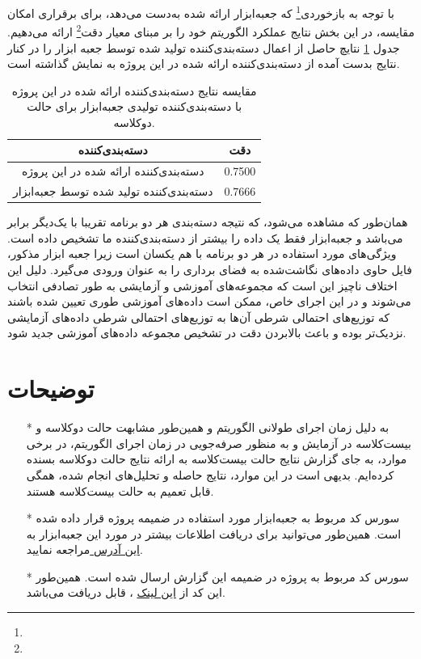 \documentclass[11.5pt,a4paper]{article}
\begin{document}
با توجه به بازخوردی\footnote{} که جعبه‌ابزار ارائه شده به‌دست می‌دهد، برای برقراری امکان مقایسه، در این بخش نتایج عملکرد الگوریتم خود را بر مبنای معیار دقت\footnote{} ارائه می‌دهیم. جدول
\ref{tbl:toolbox}
نتایچ حاصل از اعمال دسته‌بندی‌کننده تولید شده توسط جعبه ابزار را در کنار نتایج بدست ‌آمده از دسته‌بندی‌کننده ارائه شده در این پروژه به نمایش ‌گذاشته است.

\begin{table}[h]
\center
\caption{مقایسه نتایج دسته‌بندی‌کننده ارائه شده در این پروژه با دسته‌بندی‌کننده تولیدی جعبه‌ابزار برای حالت دوکلاسه.}
\label{tbl:toolbox}
\begin{tabular}{c | c}
دسته‌بندی‌کننده & دقت
\\
\hline
\hline
دسته‌بندی‌کننده ارائه شده در این‌ پروژه & 0.7500
\\
دسته‌بندی‌کننده تولید شده توسط جعبه‌ابزار & 0.7666
\\
\end{tabular}
\end{table}

همان‌طور که مشاهده می‌شود، که نتیجه دسته‌بندی هر دو برنامه تقریبا با یک‌دیگر برابر می‌باشد و جعبه‌ابزار فقط یک داده را بیشتر از دسته‌بندی‌کننده ما تشخیص داده‌ است. ویژگی‌های مورد استفاده در هر دو برنامه با هم یکسان است زیرا جعبه ابزار مذکور، فایل حاوی داده‌های نگاشت‌شده به فضای برداری را به عنوان ورودی می‌گیرد. دلیل این اختلاف ناچیز این است که مجموعه‌های آموزشی و آزمایشی به طور تصادفی انتخاب می‌شوند و در این اجرای خاص، ممکن است داده‌های آموزشی طوری تعیین شده باشند که توزیع‌های احتمالی شرطی آن‌ها به توزیع‌های احتمالی شرطی داده‌های آزمایشی نزدیک‌تر بوده و باعث بالابردن دقت در تشخیص مجموعه داده‌های ‌آموزشی جدید شود.

\vfill
\section{توضیحات}
\begin{itemize}
\item [*]به دلیل زمان اجرای طولانی الگوریتم و همین‌طور مشابهت حالت دوکلاسه و بیست‌کلاسه در آزمایش و به منظور صرفه‌جویی در زمان اجرای الگوریتم، در برخی موارد، به جای گزارش نتایج حالت بیست‌کلاسه به ارائه نتایج حالت دوکلاسه بسنده کرده‌ایم. بدیهی‌ است  در این موارد، نتایج حاصله و تحلیل‌های انجام شده، همگی قابل تعمیم به حالت بیست‌کلاسه هستند.
\item [*] سورس کد مربوط به جعبه‌ابزار مورد استفاده در ضمیمه پروژه قرار داده شده است. همین‌طور می‌توانید برای دریافت اطلاعات بیشتر در مورد این جعبه‌ابزار به 
\href{http://www.openpr.org.cn/index.php/NLP-Toolkit-for-Natural-Language-Processing/43-Naive-Bayes-Classfier/View-details.html}{این آدرس }
مراجعه نمایید.

\item [*] سورس کد مربوط به پروژه در ضمیمه این گزارش ارسال شده است. همین‌طور این کد از
\href{https://github.com/ahmad-asadi/PGM/tree/master/BayesianNetwork}
{این لینک}
، قابل 
دریافت می‌باشد.
\end{itemize}
\end{document}
